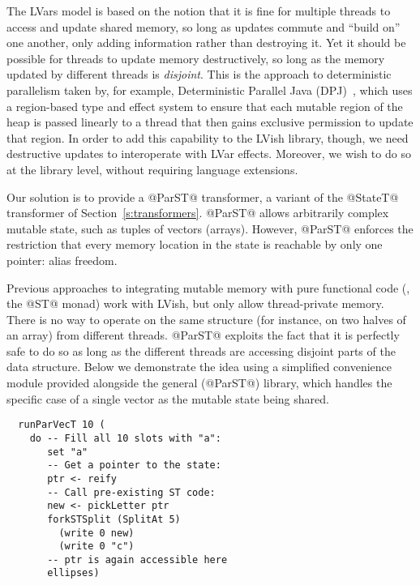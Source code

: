 The LVars model is based on the notion that it is fine for multiple
threads to access and update shared memory, so long as updates commute
and ``build on'' one another, only adding information rather than
destroying it.  Yet it should be possible for threads to update memory
destructively, so long as the memory updated by different threads is
\emph{disjoint}.  This is the approach to deterministic parallelism
taken by, for example, Deterministic Parallel Java
(DPJ)~\cite{dpj-oopsla}, which uses a region-based type and effect
system to ensure that each mutable region of the heap is passed
linearly to a thread that then gains exclusive permission to update
that region.  In order to add this capability to the LVish library,
though, we need destructive updates to interoperate with LVar effects.
Moreover, we wish to do so at the library level, without requiring
language extensions.

Our solution is to provide a @ParST@ transformer, a variant of the
@StateT@ transformer of Section~\ref{s:transformers}.  @ParST@ allows
arbitrarily complex mutable state, such as tuples of vectors (arrays).
However, @ParST@ enforces the restriction that {every} memory location
in the state is reachable by only one pointer: alias freedom.

Previous approaches to integrating mutable memory with pure functional
code (\ie, the @ST@ monad) work with LVish, but only allow
thread-private memory.  There is no way to operate on the same
structure (for instance, on two halves of an array) from different
threads.  @ParST@ exploits the fact that it is perfectly safe to do so
as long as the different threads are accessing disjoint parts of the
data structure.  Below we demonstrate the idea using a simplified
convenience module provided alongside the general (@ParST@) library,
which handles the specific case of a single vector as the mutable
state being shared.

\singlespacing
\begin{lstlisting}
  runParVecT 10 (
    do -- Fill all 10 slots with "a":
       set "a"
       -- Get a pointer to the state:
       ptr <- reify 
       -- Call pre-existing ST code:
       new <- pickLetter ptr
       forkSTSplit (SplitAt 5)
         (write 0 new)
         (write 0 "c")
       -- ptr is again accessible here
       ellipses)
\end{lstlisting}
\doublespacing

